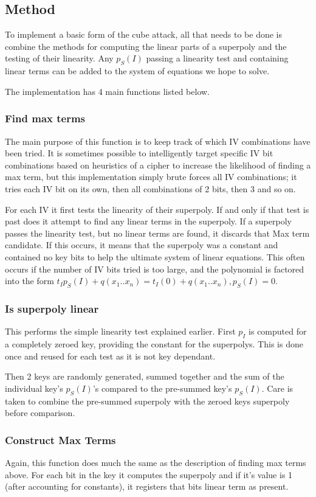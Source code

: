 \documentclass{report}
\let\Oldsubsection\subsection
\renewcommand{\subsection}{\FloatBarrier\Oldsubsection}
\let\Oldsubsubsection\subsubsection
\renewcommand{\subsubsection}{\FloatBarrier\Oldsubsubsection}
\begin{document}
\subsection{Method}
To implement a basic form of the cube attack, all that needs to be done is combine the methods for computing the linear parts of a superpoly and the testing of their linearity. Any $p_S(I)$ passing a linearity test and containing linear terms can be added to the system of equations we hope to solve.

The implementation has 4 main functions listed below.

\subsubsection{Find max terms}
The main purpose of this function is to keep track of which IV combinations have been tried. It is sometimes possible to intelligently target specific IV bit combinations based on heuristics of a cipher to increase the likelihood of finding a max term, but this implementation simply brute forces all IV combinations; it tries each IV bit on its own, then all combinations of 2 bits, then 3 and so on.

For each IV it first tests the linearity of their superpoly. If and only if that test is past does it attempt to find any linear terms in the superpoly. If a superpoly passes the linearity test, but no linear terms are found, it discards that Max term candidate. If this occurs, it means that the superpoly was a constant and contained no key bits to help the ultimate system of linear equations. This often occurs if the number of IV bits tried is too large, and the polynomial is factored into the form $t_Ip_S(I)+q(x_1..x_n)=t_I(0)+q(x_1..x_n), p_S(I)=0$.

\subsubsection{Is superpoly linear}
This performs the simple linearity test explained earlier. First $p_I$ is computed for a completely zeroed key, providing the constant for the superpolys. This is done once and reused for each test as it is not key dependant.

Then 2 keys are randomly generated, summed together and the sum of the individual key's $p_S(I)$'s compared to the pre-summed key's $p_S(I)$. Care is taken to combine the pre-summed superpoly with the zeroed keys superpoly before comparison.
\subsubsection{Construct Max Terms}
Again, this function does much the same as the description of finding max terms above. For each bit in the key it computes the superpoly and if it's value is 1 (after accounting for constants), it registers that bits linear term as present.
\end{document}
